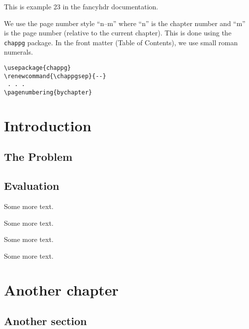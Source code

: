 \documentclass[openany]{book}
\renewcommand{\chappgsep}{--}
\begin{document}
\tableofcontents
\bigskip

\noindent
\begin{boxedminipage}{\textwidth}
This is example 23 in the fancyhdr documentation.

We use the page number style ``n--m'' where ``n'' is the chapter number and ``m'' is the page number (relative to the current chapter). 
This is done using the \texttt{chappg} package. In the front matter (Table of Contents), we use small roman numerals.

\begin{verbatim}
\usepackage{chappg}
\renewcommand{\chappgsep}{--}
 . . .
\pagenumbering{bychapter}
\end{verbatim}
\end{boxedminipage}

\chapter{Introduction}

\lipsum

\section{The Problem}

\lipsum[1]

\section{Evaluation}

\lipsum

Some more text.

Some more text.

Some more text.

Some more text.

\chapter{Another chapter}

\lipsum[2]

\section{Another section}

\lipsum[3-5]
\end{document}
